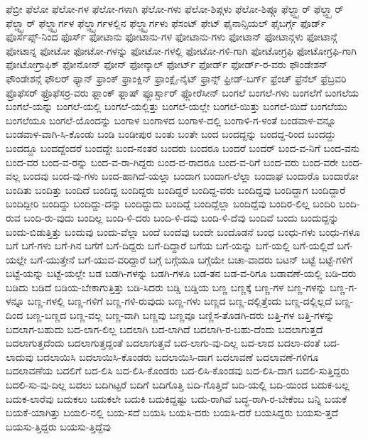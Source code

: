 {ಫೆಬ್ರೀ
ಫೆಲೋ
ಫೆಲೋ-ಗಳ
ಫೆಲೋ-ಗಳಾಗಿ
ಫೆಲೋ-ಗಳು
ಫೆಲೋ-ಶಿಪ್ಗಳು
ಫೆಲೋ-ಶಿಪ್ಗೂ
ಫೆಲ್ಟ್ಸ್ಟಾರ್
ಫೆಲ್ಡ್ಸ್ಪಾರ್
ಫೆಲ್ಡ್ಸ್ಟಾರ್
ಫೆಲ್ಡ್ಸ್ಟಾರ್ಗಳ
ಫೆಲ್ಡ್ಸ್ಟಾರ್ಗಳಲ್ಲಿನ
ಫೆಲ್ಡ್ಸ್ಟಾರ್ಗಳು
ಫೆಸಂಟ್
ಫೇಟ್
ಫೈನಾನ್ಸಿಯಲ್
ಫೈಬರ್ಗ್ಗೆ
ಫೊರ್ಡ್
ಫೊರ್ಸೆಪ್ಸ್-ನಿಂದ
ಫೊರ್ಸ್
ಫೋಟಾನು
ಫೋಟಾನು-ಗಳ
ಫೋಟಾನು-ಗಳು
ಫೋಟಾನ್
ಫೋಟಾನ್ಗಳು
ಫೋಟಾನ್ಗೆ
ಫೋಟಾನ್ನ
ಫೋಟೋ
ಫೋಟೋ-ಗಳನ್ನು
ಫೋಟೋ-ಗಳಲ್ಲಿ
ಫೋಟೋ-ಗಳಿ-ಗಾಗಿ
ಫೋಟೋಗ್ರಫಿ
ಫೋಟೋಗ್ರಫಿ-ಗಾಗಿ
ಫೋಟೋಗ್ರಾಫಿಕ್
ಫೋನೋನ್
ಫೋನ್
ಫೋನ್ಕಾಲ್
ಫೋರ್ಟ್
ಫೋರ್ಡ್
ಫೋರ್ಡ್-ರ-ವರು
ಫೌಂಡೇಶನ್
ಫೌಂಡೇಶನ್ಗೆ
ಫೌಲರ್
ಫ್ಯಾನ್
ಫ್ರಾಂಕ್
ಫ್ರಾಂಕ್ಲಿನ್
ಫ್ರಾಂಕ್ಲೈ-ನೈಟ್
ಫ್ರಾನ್ಸ್
ಫ್ರೀಡ್-ಬರ್ಗ್
ಫ್ರೆಂಚ್
ಫ್ರೆನೆಲ್
ಫ್ರೆಬ್ರವರಿ
ಫ್ರೊಫೆಸರ್
ಫ್ರೊಫೆಸರ್ರ-ವರು
ಫ್ಲಾಂಕ್
ಫ್ಲಾಷ್
ಫ್ಲೂರ್ಸ್ಟಾರ್
ಫ್ಲೋರೆಸೀನ್
ಬಂಗಲೆ
ಬಂಗಲೆ-ಗಳು
ಬಂಗಲೆಗೆ
ಬಂಗಲೆಯ
ಬಂಗಲೆ-ಯನ್ನು
ಬಂಗಲೆ-ಯಲ್ಲಿ
ಬಂಗಲೆ-ಯಲ್ಲಿತ್ತು
ಬಂಗಲೆ-ಯಲ್ಲೇ
ಬಂಗಲೆ-ಯಿತ್ತು
ಬಂಗಲೆ-ಯಿದೆ
ಬಂಗಲೆಯು
ಬಂಗಲೆಯೂ
ಬಂಗಲೆ-ಯೊಂದನ್ನು
ಬಂಗಾಳ
ಬಂಗಾಳದ
ಬಂಗಾಳ-ದಲ್ಲಿ
ಬಂಗಾಳಿ-ಗ-ಳಂತೆ
ಬಂಡವಾಳ-ವನ್ನೂ
ಬಂಡವಾಳ-ವಾಗಿ-ಸಿ-ಕೊಂಡು
ಬಂಡಿ
ಬಂಡೀಪುರ
ಬಂತು
ಬಂತೇ
ಬಂದ
ಬಂದದ್ದನ್ನು
ಬಂದದ್ದ-ರಿಂದ
ಬಂದದ್ದು
ಬಂದದ್ದೂ
ಬಂದದ್ದೆಂದರೆ
ಬಂದದ್ದೇ
ಬಂದ-ನಂತರ
ಬಂದರು
ಬಂದರೂ
ಬಂದರೆ
ಬಂದರ್
ಬಂದ-ವ-ನಿಗೆ
ಬಂದ-ವನು
ಬಂದ-ವರ
ಬಂದ-ವ-ರನ್ನು
ಬಂದ-ವ-ರಾ-ಗಿದ್ದರು
ಬಂದ-ವ-ರಾದರೂ
ಬಂದ-ವ-ರಿಗೆ
ಬಂದ-ವರು
ಬಂದ-ವರೇ
ಬಂದ-ವಲ್ಲ
ಬಂದವು
ಬಂದ-ವು-ಗಳು
ಬಂದ-ಹಾಗಿದೆ-ಯಲ್ಲಾ
ಬಂದಾಗ
ಬಂದಾಗ-ಲೆಲ್ಲಾ
ಬಂದಾಘ
ಬಂದಾರೊ
ಬಂದಾರೋ
ಬಂದಿತು
ಬಂದಿತ್ತು
ಬಂದಿದೆ
ಬಂದಿದ್ದ
ಬಂದಿದ್ದರು
ಬಂದಿದ್ದರೆ
ಬಂದಿದ್ದ-ವರು
ಬಂದಿದ್ದವು
ಬಂದಿದ್ದಾಗ
ಬಂದಿದ್ದಾರೆ
ಬಂದಿದ್ದೀರಿ
ಬಂದಿದ್ದು
ಬಂದಿದ್ದು-ದನ್ನು
ಬಂದಿದ್ದುದು
ಬಂದಿದ್ದೆ
ಬಂದಿದ್ದೆಲ್ಲಾ
ಬಂದಿದ್ದೆವು
ಬಂದಿರ-ಲಿಲ್ಲ
ಬಂದಿರಿ
ಬಂದಿ-ರುವ
ಬಂದಿ-ರು-ವುದು
ಬಂದಿಲ್ಲ
ಬಂದಿ-ಳಿ-ದರು
ಬಂದಿ-ಳಿ-ದವು
ಬಂದಿ-ಳಿ-ದೆವು
ಬಂದಿವೆ
ಬಂದು
ಬಂದುದ್ದನ್ನು
ಬಂದು-ಬಿಡುತ್ತಿತ್ತು
ಬಂದುವು
ಬಂದು-ವೆಲ್ಲಾ
ಬಂದೆ
ಬಂದೆವು
ಬಂದೇ
ಬಂದೊಡನೆ
ಬಂಧ
ಬಂಧು-ಗಳು
ಬಂಧು-ಗಳೂ
ಬಗೆ
ಬಗೆ-ಗಳು
ಬಗೆ-ಗಿನ
ಬಗೆಗೆ
ಬಗೆ-ದಿದ್ದರು
ಬಗೆ-ದಿದ್ದಾರೆ
ಬಗೆಯ
ಬಗೆ-ಯನ್ನು
ಬಗೆ-ಯಲ್ಲಿ
ಬಗೆ-ಯಲ್ಲಿದೆ
ಬಗೆ-ಯಲ್ಲೇ
ಬಗೆ-ಯುತ್ತೇನೆ
ಬಗೆ-ಯುವ-ವರಿದ್ದಾರೆ
ಬಗ್ಗೆ
ಬಗ್ಗೆಯೂ
ಬಗ್ಗೆಯೇ
ಬಚಾ-ವಾದರು
ಬಟನ್
ಬಟ್ಟೆ
ಬಟ್ಟೆ-ಗಳಿಗೆ
ಬಟ್ಟೆ-ಯನ್ನು
ಬಟ್ಟೆ-ಯಲ್ಲೇ
ಬಡ
ಬಡಗಿ-ಗಳನ್ನು
ಬಡಗಿ-ಗಳೂ
ಬಡ-ತನ
ಬಡ-ವ-ರಿಗೂ
ಬಡಾವಣೆ-ಯಲ್ಲಿ
ಬಡಿ-ದರು
ಬಡಿದು
ಬಡಿದೆ
ಬಡಿಯ-ಬೇಕಾಗುತ್ತಿತ್ತು
ಬಡಿ-ಸಿದರು
ಬಡ್ಡಿ
ಬಡ್ಡಿಯ
ಬಣ್ಣ
ಬಣ್ಣಕ್ಕೆ
ಬಣ್ಣ-ಗಳ
ಬಣ್ಣ-ಗಳನ್ನು
ಬಣ್ಣ-ಗ-ಳನ್ನೂ
ಬಣ್ಣ-ಗಳಲ್ಲಿ
ಬಣ್ಣ-ಗಳಿಗೆ
ಬಣ್ಣ-ಗಳಿ-ರುವುದು
ಬಣ್ಣ-ಗಳು
ಬಣ್ಣದ
ಬಣ್ಣ-ದಲ್ಲಿತ್ತೆಂದು
ಬಣ್ಣ-ದಲ್ಲಿಲ್ಲದೆ
ಬಣ್ಣ-ದಿಂದ
ಬಣ್ಣ-ಬಣ್ಣದ
ಬಣ್ಣ-ವಲ್ಲ
ಬಣ್ಣ-ವಾಗಿ
ಬಣ್ಣವು
ಬಣ್ಣವೂ
ಬಣ್ಣಿಸ-ತೊಡಗಿ-ದರು
ಬತ್ತಿ-ಗಳ
ಬತ್ತಿ-ಗಳನ್ನು
ಬದಲಾಗ-ಬಹುದು
ಬದ-ಲಾಗ-ಲಿಲ್ಲ
ಬದಲಾಗಿ
ಬದ-ಲಾಗಿದೆ
ಬದಲಾಗಿ-ರ-ಬಹು-ದೆಂದು
ಬದಲಾಗುತ್ತದೆ
ಬದಲಾಗುತ್ತದೆಂದು
ಬದಲಾಗುತ್ತದ್ದಂತೆ
ಬದಲಾಗುತ್ತವೆ
ಬದ-ಲಾಗು-ವು-ದಿಲ್ಲ
ಬದ-ಲಾದ
ಬದಲಾ-ದಂತೆ
ಬದ-ಲಾದುವು
ಬದಲಾಯಿಸಿ
ಬದಲಾಯಿಸಿ-ಕೊಂಡರು
ಬದಲಾಯಿಸಿ-ದಾಗ
ಬದಲಾವಣೆ
ಬದಲಾವಣೆ-ಗಳಿಗೂ
ಬದಲಾವಣೆಯ
ಬದಲಿಗೆ
ಬದ-ಲಿಸಿ
ಬದ-ಲಿಸಿ-ಕೊಂಡರು
ಬದ-ಲಿಸಿ-ಕೊಂಡವು
ಬದ-ಲಿಸಿ-ದಾಗ
ಬದಲಿ-ಸುತ್ತಿದ್ದರು
ಬದಲಿ-ಸು-ವು-ದಿಲ್ಲ
ಬದಲು
ಬದಿಗಿಟ್ಟರೆ
ಬದಿಗೆ
ಬದಿಗೊತ್ತಿ
ಬದಿ-ಗೊತ್ತಿದೆ
ಬದಿ-ಯಲ್ಲಿ
ಬದಿ-ಯಿಂದ
ಬದುಕ-ಬಲ್ಲ
ಬದುಕ-ಲಾರೆವು
ಬದುಕಲು
ಬದುಕಲೇ
ಬದುಕಿ
ಬದುಕಿದ್ದಷ್ಟು
ಬದು-ರಾಗಿವೆ
ಬದ್ಧ-ರಾಗಿ-ರ-ಬೇಕೆಂಬ
ಬನ್ನಿ
ಬಯಕೆ
ಬಯಕೆ-ಯಾಗಿತ್ತು
ಬಯಲಿ-ನಲ್ಲಿ
ಬಯ-ಸದೆ
ಬಯಸಿ
ಬಯಸಿ-ದರು
ಬಯಸಿ-ದರೆ
ಬಯಸಿದ್ದರು
ಬಯಸು-ತ್ತದೆ
ಬಯಸು-ತ್ತಿದ್ದರು
ಬಯಸು-ತ್ತಿದ್ದೆವು
}
